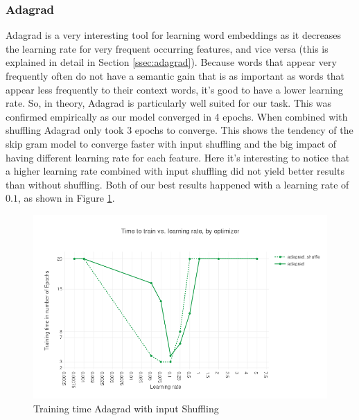 \documentclass[conference]{IEEEtran}
\begin{document}
\subsubsection{Adagrad}
Adagrad \cite{adagrad} is a very interesting tool for learning word embeddings as it decreases the learning rate for very frequent occurring features, and vice versa (this is explained in detail in Section \ref{ssec:adagrad}). Because words that appear very frequently often do not have a semantic gain that is as important as words that appear less frequently to their context words, it's good to have a lower learning rate. So, in theory, Adagrad is particularly well suited for our task. This was confirmed empirically as our model converged in 4 epochs. When combined with shuffling Adagrad only took 3 epochs to converge. This shows the tendency of the skip gram model to converge faster with input shuffling and the big impact of having different learning rate for each feature.
Here it's interesting to notice that a higher learning rate combined with input shuffling did not yield better results than without shuffling. Both of our best results happened with a learning rate of $0.1$, as shown in Figure \ref{fig:results_adagrad_shuffle}.
\begin{figure}[h]
\centering
\includegraphics[scale=0.45]{images/results_adagrad_shuffle}
\caption{Training time Adagrad with input Shuffling}
\label{fig:results_adagrad_shuffle}
\end{figure}
\end{document}
